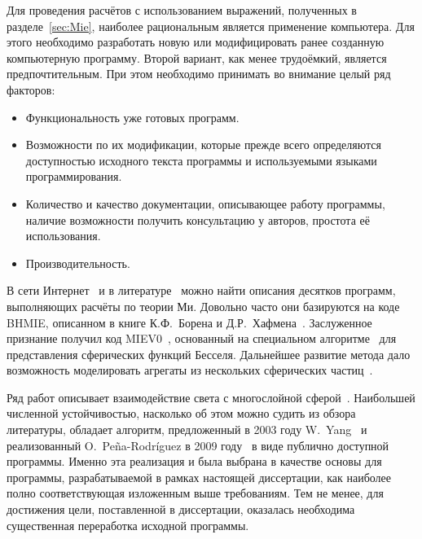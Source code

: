 
Для проведения расчётов с использованием выражений, полученных в
разделе~\ref{sec:Mie}, наиболее рациональным является применение
компьютера.  Для этого необходимо разработать новую или модифицировать
ранее созданную компьютерную программу. Второй вариант, как менее
трудоёмкий, является предпочтительным.  При этом необходимо принимать
во внимание целый ряд факторов:
\begin{itemize}
\item Функциональность уже готовых программ.
\item Возможности по их модификации, которые прежде всего определяются
  доступностью исходного текста программы и используемыми языками
  программирования.
\item Количество и качество документации, описывающее работу
  программы, наличие возможности получить консультацию у авторов,
  простота её использования.
\item Производительность.
\end{itemize}

В сети Интернет~\cite{scattport,wiki-mie-codes} и в
литературе~\cite{Wriedt-2009} можно найти описания десятков программ,
выполняющих расчёты по теории Ми.  Довольно часто они базируются на
коде BHMIE, описанном в книге К.Ф.~Борена и
Д.Р.~Хафмена~\cite{Bohren-1983}.  Заслуженное признание получил код
MIEV0~\cite{Wiscombe-1980}, основанный на специальном
алгоритме~\cite{Lentz-76} для представления сферических функций
Бесселя. Дальнейшее развитие метода дало возможность моделировать
агрегаты из нескольких сферических частиц~\cite{Mackowski-96,Xu-95}.

Ряд работ описывает взаимодействие света с многослойной
сферой~\cite{Kai-94,Wu-97, Bhandari-85}.  Наибольшей численной
устойчивостью, насколько об этом можно судить из обзора литературы,
обладает алгоритм, предложенный в 2003 году W.~Yang~\cite{Yang-2003} и
реализованный O.~Pe\~{n}a-Rodr\'{i}guez в 2009
году~\cite{Pena-scattnlay-2009} в виде публично доступной программы.
Именно эта реализация и была выбрана в качестве основы для программы,
разрабатываемой в рамках настоящей диссертации, как наиболее полно
соответствующая изложенным выше требованиям.  Тем не менее, для
достижения цели, поставленной в диссертации, оказалась необходима
существенная переработка исходной программы.


